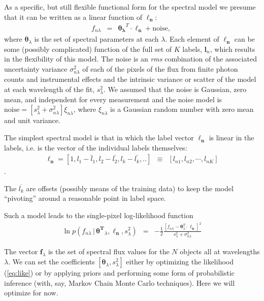 \documentclass[12pt, preprint]{aastex}
\newcommand{\set}[1]{\bm{#1}}
\newcommand{\mean}[1]{\overline{#1}}
\newcommand{\given}{\,|\,}
\begin{document}
As a specific, but still flexible functional form for the spectral model we presume that it can be written as
a linear function of $\boldsymbol{\ell_n}$: 
\begin{eqnarray}
f_{n\lambda} &=&
\boldsymbol{\theta_\lambda}^T \cdot \boldsymbol{\ell_n} + \mbox{noise},
\
\label{eq:linearmodel}
\end{eqnarray}
where $\set{\theta}_\lambda$ is the set of spectral parameters at each $\lambda$.  Each element of $\boldsymbol{\ell_n}$ can be some (possibly complicated) function of the full set of $K$ labels, $\set{l}_n$, which
results in the flexibility of this model. The noise is an \textit{rms} combination of the associated uncertainty variance
$\sigma_{n\lambda}^2$ of each of the pixels of the flux from finite photon counts and instrumental effects and the intrinsic variance or scatter of the model at each wavelength of the fit, $s_\lambda^2$. We assumed that the noise is Gaussian, zero mean, and independent for every measurement and the noise model is $\mbox{noise} = [s_\lambda^2+ \sigma_{n\lambda}^2]\xi_{n\lambda}$, where $\xi_{n\lambda}$ is a Gaussian random number with zero mean and unit
variance.

The simplest spectral model is that in which the label vector $\boldsymbol{\ell_n}$ is
linear in the labels, i.e. is the vector of the individual labels themselves:
\begin{eqnarray}
\set{\ell_n} =  [1, l_1 - \bar{l}_1, l_2 - \bar{l_2}, l_k - \bar{l_k}, .. ] &\equiv& [l_{n1}, l_{n2}, \cdots, l_{nK}]
\label{eq:linear}
\end{eqnarray}.

The $\mean{l_k}$ are offsets (possibly means of the training data) to keep the model ``pivoting'' around a reasonable point in label space.


Such a  model leads to the single-pixel log-likelihood function 
\begin{eqnarray}
\ln p(f_{n\lambda}\given\set{\theta^T}_\lambda, \boldsymbol{\ell_n}, s_\lambda^2) &=&
 -\frac{1}{2}\frac{[f_{n\lambda} - \set{\theta}^T_\lambda \cdot \set{\ell_n}]^2}{s_\lambda^2 + \sigma_{n\lambda}^2}
\label{eq:like}
\end{eqnarray}


The vector $\set{f}_\lambda$ is the set of spectral flux values for
the $N$ objects all at wavelengths $\lambda$.
We can set the coefficients $[\set{\theta}_\lambda,s_\lambda^2]$ either by
optimizing the likelihood (\ref{eq:like}) or by applying priors and
performing some form of probabilistic inference (with, say, Markov
Chain Monte Carlo techniques).
Here we will optimize for now.
\end{document}
